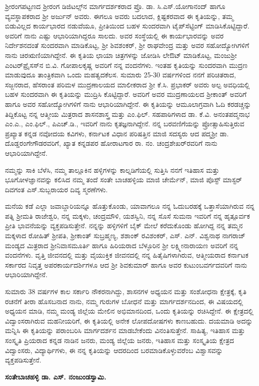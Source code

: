 ಶ್ರೀರಂಗಪಟ್ಟಣದ ಶ್ರೀರಂಗ ಡಿಜಿಟಲ್ಸ್​ನ ಮಾರ್ಗದರ್ಶಕರಾದ ಪ್ರೊ. ಡಾ. ಸಿ.ಎಸ್​.ಯೋಗಾನಂದ್​ ಹಾಗೂ ವ್ಯವಸ್ಥಾಪಕರಾದ ಶ್ರೀ ಅರ್ಜುನ್​ ಅವರು. ಈಗಲೂ ಅವರು ಬದಲಾದ, ಕ್ಲಿಷ್ಟಕರವಾದ ಈ ಕೃತಿಯನ್ನು, ತಮ್ಮ ಬಿಡುವಿಲ್ಲದ ಕಾರ್ಯಭಾರದ ನಡುವೆಯೂ, ಪ್ರೀತಿಯಿಂದ ಬಹಳ ಸುಂದರವಾಗಿ ಟೈಪ್​ಸೆಟ್ಟಿಂಗ್​ ಮಾಡಿಸಿಕೊಟ್ಟಿದ್ದಾರೆ. ಅವರಿಗೆ ನಾನು ಎಷ್ಟು ಆಭಾರಿ\-ಯಾಗಿದ್ದರೂ ಸಾಲದು. ಅವರ ಸಂಸ್ಥೆಯಲ್ಲಿ ಈ ಕಾರ್ಯಭಾರವನ್ನು ಅವರ ನಿರ್ದೇಶನದಂತೆ ಸುಂದರವಾಗಿ ಮಾಡಿಕೊಟ್ಟ,  ಶ್ರೀ ಶಿವಶಂಕರ್​, ಶ್ರೀ ರಾಘವೇಂದ್ರ ಮತ್ತು ಅವರ ಸಹೋದ್ಯೋಗಿಗಳಿಗೆ ನಾನು ಚಿರಋಣಿಯಾಗಿದ್ದೇನೆ. ಈ ಕೃತಿಯ ಛಾಯಾ ಚಿತ್ರಗಳನ್ನು ಜೋಡಿಸಿ ಲೇಔಟ್​ ಮಾಡಿಕೊಟ್ಟ, ಮಂಜುಶ್ರೀ ಎಂಟರ್​\-ಪ್ರೈಸಸ್​ನ ಬಿ.ವಿ. ಗೋಪಾಲಕೃಷ್ಣ ಅವರಿಗೆ ನನ್ನ ವಂದನೆಗಳು.  ಇಂತಹ ಕೃತಿಯನ್ನು ಸುಂದರವಾಗಿ ಮುದ್ರಣ ಮಾಡುವುದೂ ತಾಂತ್ರಿಕವಾಗಿ  ಒಂದು ಮಹತ್ವದ\break ಕೆಲಸ.  ಸುಮಾರು 25{\rm -}30 ವರ್ಷಗಳಿಂದ ನನಗೆ ಪರಿಚಿತರಾದ, ಸಜ್ಜನರಾದ, ಹೆಸರಾಂತ ಪರಿಮಳ ಮುದ್ರಣಾಲಯದ ಮಾಲೀಕ\-ರಾದ ಶ್ರೀ ಕೆ.ಸಿ. ಪ್ರಭಾಕರ್​ ಅವರು ಅಲ್ಪ ಅವಧಿಯಲ್ಲಿ ಬಹಳ ಸುಂದರವಾಗಿ ಈ ಕೃತಿಯನ್ನು ಮುದ್ರಿಸಿ ಕೊಟ್ಟಿದ್ದಾರೆ. ಅವರಿಗೆ ಅವರ ಮುದ್ರಣಾಯಲದ ಶ್ರೀಕಾಂತ್​ ಅವರಿಗೆ ಹಾಗೂ ಅವರ ಸಹೋದ್ಯೋಗಿ\-ಗಳಿಗೆ ನಾನು ಆಭಾರಿಯಾಗಿದ್ದೇನೆ. ಈ ಕೃತಿಯನ್ನು ಆಮೂಲಾಗ್ರವಾಗಿ ಓದಿ ಕರಡಚ್ಚನ್ನು ತಿದ್ದಿಕೊಟ್ಟ ನನ್ನ ಆತ್ಮೀಯ ಮಿತ್ರರಾದ ಶಾಸನಶಾಸ್ತ್ರ ಮತ್ತು ಎಂ.ಫಿಲ್. ಸಹಪಾಠಿಗಳಾದ ಡಾ. ಕೆ.ವಿ. ಅನಂತಪದ್ಮನಾಭ ಎಂ.ಎ., ಎಂ.ಫಿಲ್., ಪಿಎಚ್.ಡಿ., ಇವರಿಗೆ ನಾನು ಕೃತಜ್ಞನಾಗಿದ್ದೇನೆ. ನನ್ನ ಬರವಣಿಗೆಯನ್ನು ಪ್ರೋತ್ಸಾಹಿಸುತ್ತಿರುವ ಪ್ರಖ್ಯಾತ ಕನ್ನಡ ನವೋದಯ ಕವಿಗಳು, ಕರ್ನಾಟಕ ವಿಧಾನ ಪರಿಷತ್ತಿನ ಮಾಜಿ ಸದಸ್ಯರು ಆದ ಪದ್ಮಶ್ರೀ ಡಾ. ದೊಡ್ಡರಂಗೇಗೌಡರವರಿಗೆ, ಖ್ಯಾತ ಕನ್ನಡಪರ ಹೋರಾಟಗಾರ ರಾ. ನಂ. ಚಂದ್ರಶೇಖರ್‌ರವರಿಗೆ ನಾನು ಆಭಾರಿಯಾಗಿದ್ದೇನೆ.

ನಮ್ಮನ್ನು ಸಾಕಿ ಬೆಳೆಸಿ, ನಮ್ಮ ತಾಲ್ಲೂಕಿನ ಹಳ್ಳಿಗಳನ್ನು ಕಾಲ್ನಡಿಗೆಯಲ್ಲಿ ಸುತ್ತಿಸಿ ನನಗೆ ಇತಿಹಾಸ ಮತ್ತು ಭೂಗೋಳ\break ಜ್ಞಾನವನ್ನು ಕಲಿಸಿದ ನಮ್ಮ ತಂದೆ ಸಂತೇ ಬಾಚಹಳ್ಳಿಯ ಮಾಜಿ ಚೇರ್ಮೆನ್, ಮಾಜಿ ಪೊಸ್ಟ್ ಮಾಸ್ಟರ್ ದಿವಗಂತ ಎಸ್.\break ಸುಬ್ಬರಾಯರ ದಿವ್ಯ ಸ್ಮರಣೆಗಳು.

ಮನೆಯ ಕಡೆ ಎಲ್ಲಾ ಜವಾಬ್ದಾರಿಯನ್ನೂ ಹೊತ್ತುಕೊಂಡು, ಯಾವಾಗಲೂ ನನ್ನ ಓದುಬರಹಕ್ಕೆ ಒತ್ತಾಸೆಯಾಗಿರುವ ನನ್ನ ಪತ್ನಿ ಶ್ರೀಮತಿ ರಾಜೇಶ್ವರಿ, ನನ್ನ ಮಕ್ಕಳು, ಚಂದ್ರಮೌಳಿ, ಯಶಸ್ವಿನಿ, ನನ್ನ ಸೊಸೆ ಸುಮನಾ ಇವರಿಗೆ ನನ್ನ ಹೃತ್ಪೂರ್ವಕ ಪ್ರೀತಿ ಭಾವನೆಯನ್ನು ವ್ಯಕ್ತಪಡಿಸುತ್ತೇನೆ. ನನ್ನನ್ನು ಹಳ್ಳಿಗಳಿಗೆ ಬೈಕ್​ ಮೇಲೆ ಕರೆದುಕೊಂಡು ಹೋಗಿದ್ದ ನನ್ನ ತಮ್ಮನ ಮಕ್ಕಳಾದ  ರೋಹಿತ್​ ಶ್ರೀಪತಿ, ಶ್ರೀಕಾಂತ್​ ಸುಬ್ರಹ್ಮಣ್ಯ, ಶಶಾಂಕ್ ರವಿಶಂಕರ್, ಎಸ್. ಎನ್. ವಿಶ್ವನಾಥ ನಾಗರಾಜ್ ಮಂಡ್ಯದ ಮಿತ್ರರಾದ ಶ್ರೀನಿವಾಸಮೂರ್ತಿ ಹಾಗೂ ಹಿರಿಯರಾದ ಬೆಳ್ಳೂರಿನ ಶ್ರೀ ಲಕ್ಷ್ಮೀನಾರಾಯಣ ಅವರಿಗೆ ನನ್ನ ವಂದನೆಗಳು. ವೃತ್ತಿ ಜೀವನದಲ್ಲಿ ಮತ್ತು ವೈಯುಕ್ತಿಕ ಜೀವನದಲ್ಲಿ ನನ್ನ ಹಿತೈಷಿಗಳಾಗಿರುವ, ಆತ್ಮೀಯರಾದ ಕರ್ನಾಟಕ ಸರ್ಕಾರದ ನಿವೃತ್ತ ಅಪರಕಾರ್ಯದರ್ಶಿ\-ಗಳೂ ಆದ ಶ್ರೀ ಶಿವಕುಮಾರ್ ಹಾಗೂ ಅವರ ಕುಟುಂಬವರ್ಗದವರಿಗೆ ನಾನು ಆಭಾರಿಯಾಗಿದ್ದೇನೆ.

ಸುಮಾರು 38 ವರ್ಷಗಳ ಕಾಲ ಸರ್ಕಾರಿ ನೌಕರನಾಗಿದ್ದು, ಶಾಸನಗಳ ಅಧ್ಯಯನ ಮತ್ತು ಸಂಶೋಧನಾ ಕ್ಷೇತ್ರಕ್ಕೆ, ಕೃತಿ ರಚನೆಗೆ ತೀರಾ ಹೊಸಬನಾದ ನಾನು, ನಮ್ಮ ಗುರುಗಳ ಬೋಧನೆ ಮತ್ತು ಮಾರ್ಗದರ್ಶನದಿಂದ, ಈ ವಿಷಯದಲ್ಲಿ ಅಧ್ಯಯನ ಮಾಡಿ, ನಮ್ಮ ಮಂಡ್ಯ ಜಿಲ್ಲೆಯ ಮೇಲಿನ ಅಭಿಮಾನದಿಂದ, ಒಂದು ಕೃತಿಯನ್ನು ರಚಿಸಿದ್ದೇನೆ. ಈ ಕ್ಷೇತ್ರದಲ್ಲಿ ವಿದ್ವಾಂಸ\-ರಾಗಿರುವ ಮಹನೀಯರಿಗೆ, ಈ ಕೃತಿಯಲ್ಲಿ ಅನೇಕ ಲೋಪದೋಷಗಳು ಕಾಣಬಹುದು. ದಯಮಾಡಿ ಅದನ್ನು ಮನ್ನಿಸಿ ಈ ಕೃತಿಯನ್ನು ಪರಾಂಬರಿಸಿ ಮಾರ್ಗದರ್ಶನ ಮಾಡಬೇಕೆಂದು ವಿನಂತಿಸುತ್ತೇನೆ.  ಸಾಹಿತ್ಯ, ಇತಿಹಾಸ ಮತ್ತು ಸಂಸ್ಕೃತಿ ಪ್ರಿಯರಾದ ಕನ್ನಡ ನಾಡಿನ ಜನರು,  ಮಂಡ್ಯ ಜಿಲ್ಲೆಯ ಜನರು, ಇತಿಹಾಸ ಮತ್ತು ಸಂಸ್ಕೃತಿಯ ಕ್ಷೇತ್ರದ ವಿದ್ವಾಂಸರು, ವಿದ್ಯಾರ್ಥಿಗಳು, ಈ ನನ್ನ ಕೃತಿಯನ್ನು ಆದರದಿಂದ ಬರಮಾಡಿಕೊಳ್ಳುವರೆಂಬ ವಿಶ್ವಾಸವನ್ನು ವ್ಯಕ್ತಪಡಿಸುತ್ತೇನೆ.

\bigskip

\begin{flushright}
\textbf{ಸಂತೇಬಾಚಹಳ್ಳಿ ಡಾ. ಎಸ್​. ನಂಜುಂಡಸ್ವಾಮಿ.}
\end{flushright}

